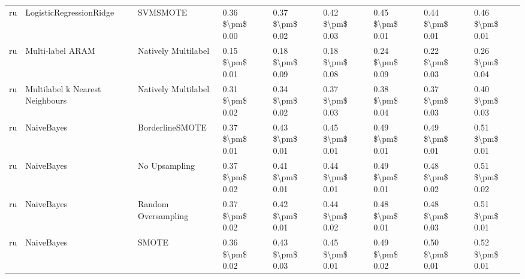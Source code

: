 \begin{tabular}{lllllllll}
      ru &         LogisticRegressionRidge &                      SVMSMOTE & 0.36 \$\textbackslash pm\$ 0.00 &           0.37 \$\textbackslash pm\$ 0.02 &       0.42 \$\textbackslash pm\$ 0.03 &        0.45 \$\textbackslash pm\$ 0.01 &                         0.44 \$\textbackslash pm\$ 0.01 &     0.46 \$\textbackslash pm\$ 0.01 \\
      ru &                Multi-label ARAM &           Natively Multilabel & 0.15 \$\textbackslash pm\$ 0.01 &           0.18 \$\textbackslash pm\$ 0.09 &       0.18 \$\textbackslash pm\$ 0.08 &        0.24 \$\textbackslash pm\$ 0.09 &                         0.22 \$\textbackslash pm\$ 0.03 &     0.26 \$\textbackslash pm\$ 0.04 \\
      ru & Multilabel k Nearest Neighbours &           Natively Multilabel & 0.31 \$\textbackslash pm\$ 0.02 &           0.34 \$\textbackslash pm\$ 0.02 &       0.37 \$\textbackslash pm\$ 0.03 &        0.38 \$\textbackslash pm\$ 0.04 &                         0.37 \$\textbackslash pm\$ 0.03 &     0.40 \$\textbackslash pm\$ 0.03 \\
      ru &                      NaiveBayes &               BorderlineSMOTE & 0.37 \$\textbackslash pm\$ 0.01 &           0.43 \$\textbackslash pm\$ 0.01 &       0.45 \$\textbackslash pm\$ 0.01 &        0.49 \$\textbackslash pm\$ 0.01 &                         0.49 \$\textbackslash pm\$ 0.01 &     0.51 \$\textbackslash pm\$ 0.01 \\
      ru &                      NaiveBayes &                 No Upsampling & 0.37 \$\textbackslash pm\$ 0.02 &           0.41 \$\textbackslash pm\$ 0.01 &       0.44 \$\textbackslash pm\$ 0.01 &        0.49 \$\textbackslash pm\$ 0.01 &                         0.48 \$\textbackslash pm\$ 0.02 &     0.51 \$\textbackslash pm\$ 0.02 \\
      ru &                      NaiveBayes &           Random Oversampling & 0.37 \$\textbackslash pm\$ 0.02 &           0.42 \$\textbackslash pm\$ 0.01 &       0.44 \$\textbackslash pm\$ 0.02 &        0.48 \$\textbackslash pm\$ 0.01 &                         0.48 \$\textbackslash pm\$ 0.03 &     0.51 \$\textbackslash pm\$ 0.01 \\
      ru &                      NaiveBayes &                         SMOTE & 0.36 \$\textbackslash pm\$ 0.02 &           0.43 \$\textbackslash pm\$ 0.03 &       0.45 \$\textbackslash pm\$ 0.01 &        0.49 \$\textbackslash pm\$ 0.02 &                         0.50 \$\textbackslash pm\$ 0.01 &     0.52 \$\textbackslash pm\$ 0.01 \\

\end{tabular}
